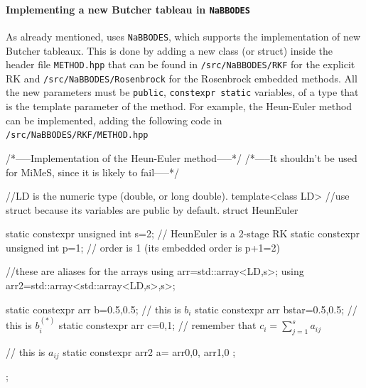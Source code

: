 \documentclass[11pt,a4paper]{article}
\begin{document}
\paragraph{Implementing a new Butcher tableau in {\tt NaBBODES}} As already mentioned, \mimes uses {\tt NaBBODES}, which supports the implementation of new Butcher tableaux. This is done by adding a new class (or struct) inside the header file {\tt METHOD.hpp} that can be found in {\tt \mimes/src/NaBBODES/RKF} for the explicit RK and  {\tt \mimes/src/NaBBODES/Rosenbrock} for the Rosenbrock embedded methods. All the new parameters must be {\tt public},  {\tt constexpr static} variables, of a type that is the template parameter of the method. For example, the Heun-Euler method can be implemented, adding the following code in  {\tt \mimes/src/NaBBODES/RKF/METHOD.hpp}
%
\begin{cpp}
	/*-----Implementation of the Heun-Euler method-----*/
	/*-----It shouldn't be used for MiMeS, since it is likely to fail-----*/
	
	//LD is the numeric type (\ie double, or long double).
	template<class LD>
	//use struct because its variables are public by default.
	struct HeunEuler{  
		static constexpr unsigned int s=2; // HeunEuler is a 2-stage RK
		static constexpr unsigned int p=1; // order is 1 (its embedded order is p+1=2)

		//these are aliases for the arrays
		using arr=std::array<LD,s>;
		using arr2=std::array<std::array<LD,s>,s>;
		
		static constexpr arr b={0.5,0.5}; // this is $b_i$
		static constexpr arr bstar={0.5,0.5}; // this is $b_i^{(*)}$
		static constexpr arr c={0,1}; // remember that $c_i = \displaystyle\sum_{j=1}^{s} a_{ij}$
		
		// this is $a_{ij}$
		static constexpr arr2 a={
			arr{0,0},
			arr{1,0}
		};			
	};
\end{cpp}
\end{document}
